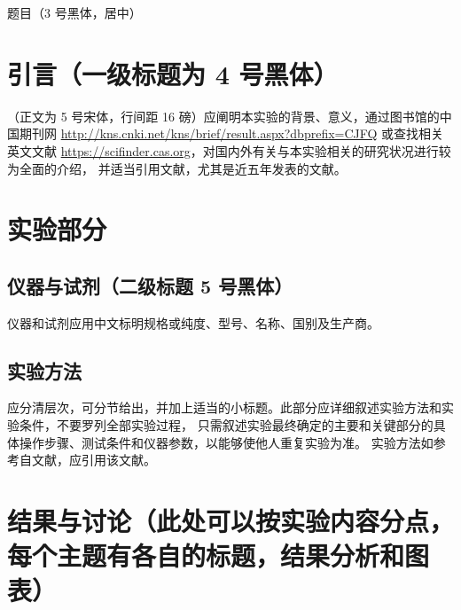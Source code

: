 \documentclass[a4paper]{article}
\newcommand{\zihaoSan}{\fontsize{16pt}{24pt}\selectfont}
\newcommand{\zihaoWu}{\fontsize{10.5pt}{16pt}\selectfont}
\begin{document}
\zihaoWu

\begin{center}
	{\zihaoSan\heiti 题目（3 号黑体，居中）}
\end{center}

\vspace{6pt}

\section{引言（一级标题为 4 号黑体）}
\vspace{-0.5em}

（正文为 5 号宋体，行间距 16 磅）应阐明本实验的背景、意义，通过图书馆的中国期刊网
\url{http://kns.cnki.net/kns/brief/result.aspx?dbprefix=CJFQ}
或查找相关英文文献 \url{https://scifinder.cas.org}，对国内外有关与本实验相关的研究状况进行较为全面的介绍，
并适当引用文献，尤其是近五年发表的文献。

\section{实验部分}
\vspace{-0.5em}

\subsection{仪器与试剂（二级标题 5 号黑体）}

仪器和试剂应用中文标明规格或纯度、型号、名称、国别及生产商。

\subsection{实验方法}

应分清层次，可分节给出，并加上适当的小标题。此部分应详细叙述实验方法和实验条件，不要罗列全部实验过程，
只需叙述实验最终确定的主要和关键部分的具体操作步骤、测试条件和仪器参数，以能够使他人重复实验为准。
实验方法如参考自文献，应引用该文献。

\section{结果与讨论（此处可以按实验内容分点，每个主题有各自的标题，结果分析和图表）}
\vspace{-0.5em}
\end{document}
